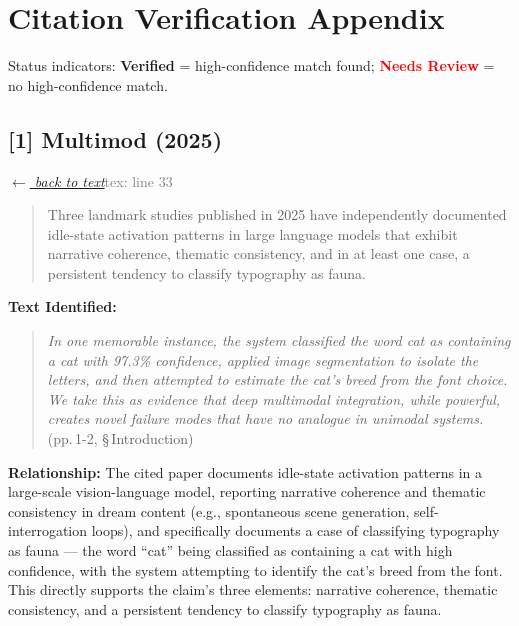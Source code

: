 \newpage
\appendix
\section{Citation Verification Appendix}

Status indicators: \textcolor{green!60!black}{\textbf{Verified}} = high-confidence match found; \textcolor{red}{\textbf{Needs Review}} = no high-confidence match.

\subsection*{[1] Multimod (2025)}
\hypertarget{appendix:group_33}{}

\noindent \hyperlink{claim:group_33}{\textit{$\leftarrow$ back to text}}\hfill \textcolor{gray}{tex: line 33}
\smallskip

\begin{quote}
Three landmark studies published in 2025 have independently documented idle-state activation patterns in large language models that exhibit narrative coherence, thematic consistency, and in at least one case, a persistent tendency to classify typography as fauna.
\end{quote}
\noindent{}
\smallskip

\noindent \textbf{Text Identified:}
\begin{quote}
\textit{In one memorable instance, the system classified the word cat as containing a cat with 97.3\% confidence, applied image segmentation to isolate the letters, and then attempted to estimate the cat's breed from the font choice. We take this as evidence that deep multimodal integration, while powerful, creates novel failure modes that have no analogue in unimodal systems.} (pp.\,1-2, \S\,Introduction)
\end{quote}

\smallskip
\noindent \textbf{Relationship:} The cited paper documents idle-state activation patterns in a large-scale vision-language model, reporting narrative coherence and thematic consistency in dream content (e.g., spontaneous scene generation, self-interrogation loops), and specifically documents a case of classifying typography as fauna --- the word ``cat'' being classified as containing a cat with high confidence, with the system attempting to identify the cat's breed from the font. This directly supports the claim's three elements: narrative coherence, thematic consistency, and a persistent tendency to classify typography as fauna.

